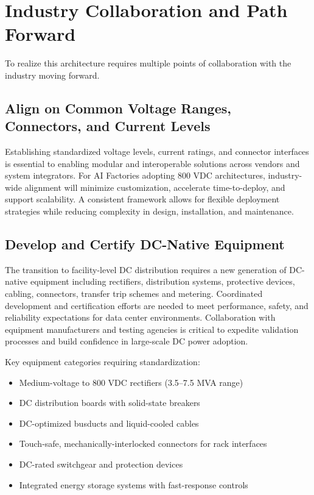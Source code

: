 \section{Industry Collaboration and Path Forward}

To realize this architecture requires multiple points of collaboration with the industry moving forward.

\subsection*{Align on Common Voltage Ranges, Connectors, and Current Levels}

Establishing standardized voltage levels, current ratings, and connector interfaces is essential to enabling modular and interoperable solutions across vendors and system integrators. For AI Factories adopting 800 VDC architectures, industry-wide alignment will minimize customization, accelerate time-to-deploy, and support scalability. A consistent framework allows for flexible deployment strategies while reducing complexity in design, installation, and maintenance.

\subsection*{Develop and Certify DC-Native Equipment}

The transition to facility-level DC distribution requires a new generation of DC-native equipment including rectifiers, distribution systems, protective devices, cabling, connectors, transfer trip schemes and metering. Coordinated development and certification efforts are needed to meet performance, safety, and reliability expectations for data center environments. Collaboration with equipment manufacturers and testing agencies is critical to expedite validation processes and build confidence in large-scale DC power adoption.

Key equipment categories requiring standardization:
\begin{itemize}
\item Medium-voltage to 800 VDC rectifiers (3.5--7.5 MVA range)
\item DC distribution boards with solid-state breakers
\item DC-optimized busducts and liquid-cooled cables
\item Touch-safe, mechanically-interlocked connectors for rack interfaces
\item DC-rated switchgear and protection devices
\item Integrated energy storage systems with fast-response controls
\end{itemize}

